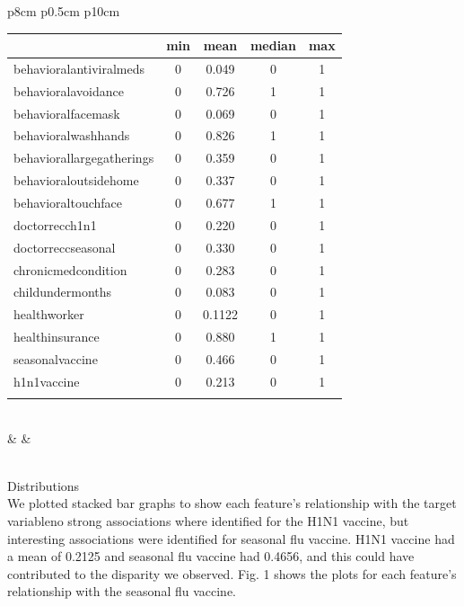 \documentclass{IEEEtran}
\begin{document}
\begin{@twocolumnfalse}
\begin{center}
{\begin{tabular}{p{8cm} p{0.5cm} p{10cm}}
\begin{tabular}{| l |c|c|c|c|} %
\hline 
& \textbf{min} & \textbf{mean} & \textbf{median} & \textbf{max} \\
\hline 
behavioral\textunderscore antiviral\textunderscore meds & 0 & 0.049 & 0 & 1\\
\hline
behavioral\textunderscore avoidance & 0 & 0.726 & 1 & 1\\
\hline 
behavioral\textunderscore face\textunderscore mask & 0 & 0.069 & 0 & 1\\
\hline 
behavioral\textunderscore wash\textunderscore hands & 0 & 0.826 & 1 & 1\\
\hline 
behavioral\textunderscore large\textunderscore gatherings & 0 & 0.359 & 0 & 1\\
\hline
behavioral\textunderscore outside\textunderscore home & 0 & 0.337 & 0 & 1\\
\hline 
behavioral\textunderscore touch\textunderscore face & 0 & 0.677 & 1 & 1\\
\hline 
doctor\textunderscore recc\textunderscore h1n1 & 0 & 0.220 & 0 & 1\\
\hline 
doctor\textunderscore recc\textunderscore seasonal & 0 & 0.330 & 0 & 1\\
\hline 
chronic\textunderscore med\textunderscore condition & 0 & 0.283 & 0 & 1\\
\hline 
child\textunderscore under\textunderscore 6\textunderscore months & 0 & 0.083 & 0 & 1\\
\hline
health\textunderscore worker & 0 & 0.1122 & 0 & 1\\
\hline
health\textunderscore insurance & 0 & 0.880 & 1 & 1\\
\hline
seasonal\textunderscore vaccine & 0 & 0.466 & 0 & 1\\
\hline
h1n1\textunderscore vaccine & 0 & 0.213 & 0 & 1\\
\hline
\multicolumn{4}{l}{}\\
\end{tabular}\\
& & \\
\\
\end{tabular}%
}
\end{center}
{\huge Distributions}\\
We plotted stacked bar graphs to show each feature's relationship with the target variable\textemdash no strong associations where identified for the H1N1 vaccine, but interesting associations were identified for seasonal flu vaccine. H1N1 vaccine had a mean of 0.2125 and seasonal flu vaccine had 0.4656, and this could have contributed to the disparity we observed.  Fig. 1 shows the plots for each feature's relationship with the seasonal flu vaccine. \\\\

\end{@twocolumnfalse}
\end{document}
